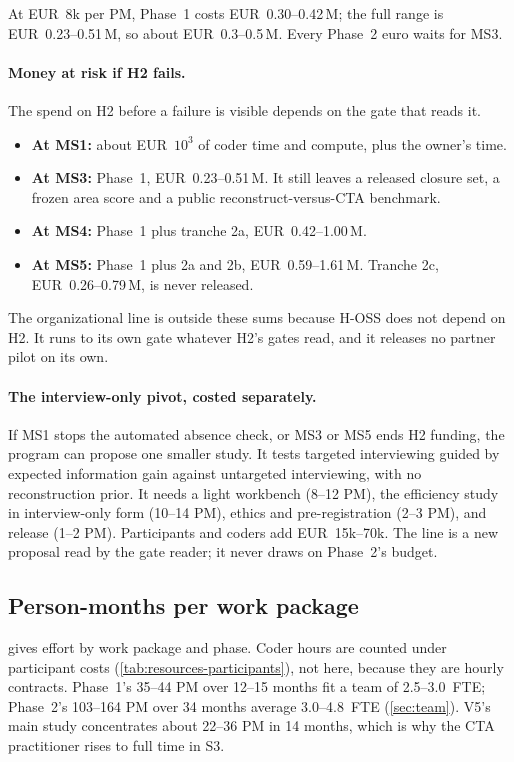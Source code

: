 \evint{} At EUR~8k per PM, Phase~1 costs EUR~0.30--0.42\,M; the full range is EUR~0.23--0.51\,M,
so about EUR~0.3--0.5\,M. Every Phase~2 euro waits for MS3.

\paragraph{Money at risk if H2 fails.} The spend on H2 before a failure is visible depends on the
gate that reads it.
\begin{itemize}[noitemsep]
  \item \textbf{At MS1:} about EUR~$10^3$ of coder time and compute, plus the owner's time.
  \item \textbf{At MS3:} Phase~1, EUR~0.23--0.51\,M. It still leaves a released closure set, a
    frozen area score and a public reconstruct-versus-CTA benchmark.
  \item \textbf{At MS4:} Phase~1 plus tranche 2a, EUR~0.42--1.00\,M.
  \item \textbf{At MS5:} Phase~1 plus 2a and 2b, EUR~0.59--1.61\,M. Tranche 2c, EUR~0.26--0.79\,M,
    is never released.
\end{itemize}
The organizational line is outside these sums because H-OSS does not depend on H2. It runs to its
own gate whatever H2's gates read, and it releases no partner pilot on its own.

\paragraph{The interview-only pivot, costed separately.} If MS1 stops the automated absence check,
or MS3 or MS5 ends H2 funding, the program can propose one smaller study. It tests targeted
interviewing guided by expected information gain against untargeted interviewing, with no
reconstruction prior. It needs a light workbench (8--12 PM), the efficiency study in
interview-only form (10--14 PM), ethics and pre-registration (2--3 PM), and release (1--2 PM).
Participants and coders add EUR~15k--70k. The line is a new proposal read by the gate reader; it never draws on Phase~2's
budget.

\subsection{Person-months per work package}

 gives effort by work package and phase. Coder hours are counted under
participant costs (\cref{tab:resources-participants}), not here, because they are hourly
contracts. Phase~1's 35--44 PM over 12--15 months fit a team of 2.5--3.0~FTE; Phase~2's 103--164
PM over 34 months average 3.0--4.8~FTE (\cref{sec:team}). V5's main study concentrates about
22--36 PM in 14 months, which is why the CTA practitioner rises to full time in S3.

